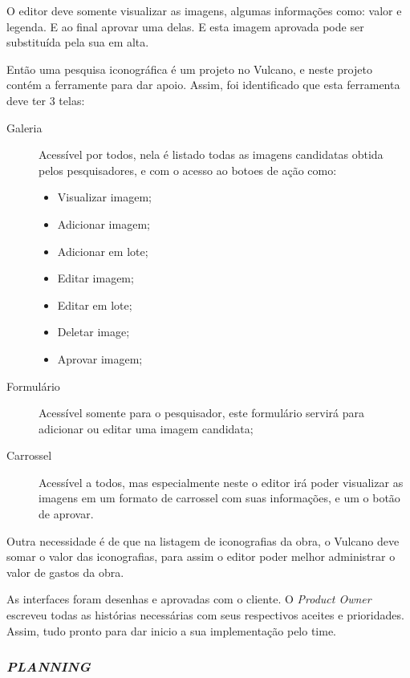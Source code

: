 \documentclass[
  12pt,				%
  openany,
  oneside,
  a4paper,			%
  english,			%
  brazil
]{article}
\numberwithin{figure}{section}
\numberwithin{table}{section}
\begin{document}
O editor deve somente visualizar as imagens, algumas informações como: valor e legenda. E ao final aprovar uma delas. E esta imagem aprovada pode ser substituída pela sua em alta.

Então uma pesquisa iconográfica é um projeto no Vulcano, e neste projeto contém a ferramente para dar apoio. Assim, foi identificado que esta ferramenta deve ter 3 telas:

\begin{description}
	\item[Galeria] Acessível por todos, nela é listado todas as imagens candidatas obtida pelos pesquisadores, e com o acesso ao botoes de ação como:
	
	\vspace{-10mm}
	\begin{singlespace}
		\begin{itemize}
			\item Visualizar imagem;
			\item Adicionar imagem;
			\item Adicionar em lote;
			\item Editar imagem;
			\item Editar em lote;
			\item Deletar image;
			\item Aprovar imagem;
		\end{itemize}
	\end{singlespace}
	\vspace{-5mm}

	\item[Formulário] Acessível somente para o pesquisador, este formulário servirá para adicionar ou editar uma imagem candidata;
	
	\item[Carrossel] Acessível a todos, mas especialmente neste o editor irá poder visualizar as imagens em um formato de carrossel com suas informações, e um o botão de aprovar.
\end{description}

Outra necessidade é de que na listagem de iconografias da obra, o Vulcano deve somar o valor das iconografias, para assim o editor poder melhor administrar o valor de gastos da obra.

As interfaces foram desenhas e aprovadas com o cliente. O \textit{Product Owner} escreveu todas as histórias necessárias com seus respectivos aceites e prioridades. Assim, tudo pronto para dar inicio a sua implementação pelo time.


\subsubsection{\textit{PLANNING}}
\end{document}
